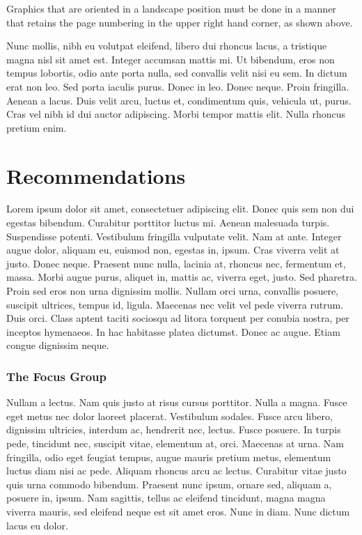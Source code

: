 \documentclass[12pt]{report}
\begin{document}

Graphics that are oriented in a landscape position must be done in a manner that retains the page numbering in the upper right hand corner, as shown above.  

Nunc mollis, nibh eu volutpat eleifend, libero dui rhoncus lacus, a tristique magna nisl sit amet est. Integer accumsan mattis mi. Ut bibendum, eros non tempus lobortis, odio ante porta nulla, sed convallis velit nisi eu sem. In dictum erat non leo. Sed porta iaculis purus. Donec in leo. Donec neque. Proin fringilla. Aenean a lacus. Duis velit arcu, luctus et, condimentum quis, vehicula ut, purus. Cras vel nibh id dui auctor adipiscing. Morbi tempor mattis elit. Nulla rhoncus pretium enim.


\chapter{Recommendations}

Lorem ipsum dolor sit amet, consectetuer adipiscing elit. Donec quis sem non dui egestas bibendum. Curabitur porttitor luctus mi. Aenean malesuada turpis. Suspendisse potenti. Vestibulum fringilla vulputate velit. Nam at ante. Integer augue dolor, aliquam eu, euismod non, egestas in, ipsum. Cras viverra velit at justo. Donec neque. Praesent nunc nulla, lacinia at, rhoncus nec, fermentum et, massa. Morbi augue purus, aliquet in, mattis ac, viverra eget, justo. Sed pharetra. Proin sed eros non urna dignissim mollis. Nullam orci urna, convallis posuere, suscipit ultrices, tempus id, ligula. Maecenas nec velit vel pede viverra rutrum. Duis orci. Class aptent taciti sociosqu ad litora torquent per conubia nostra, per inceptos hymenaeos. In hac habitasse platea dictumst. Donec ac augue. Etiam congue dignissim neque.

\subsection{The Focus Group}    

Nullam a lectus. Nam quis justo at risus cursus porttitor. Nulla a magna. Fusce eget metus nec dolor laoreet placerat. Vestibulum sodales. Fusce arcu libero, dignissim ultricies, interdum ac, hendrerit nec, lectus. Fusce posuere. In turpis pede, tincidunt nec, suscipit vitae, elementum at, orci. Maecenas at urna. Nam fringilla, odio eget feugiat tempus, augue mauris pretium metus, elementum luctus diam nisi ac pede. Aliquam rhoncus arcu ac lectus. Curabitur vitae justo quis urna commodo bibendum. Praesent nunc ipsum, ornare sed, aliquam a, posuere in, ipsum. Nam sagittis, tellus ac eleifend tincidunt, magna magna viverra mauris, sed eleifend neque est sit amet eros. Nunc in diam. Nunc dictum lacus eu dolor.
\end{document}
